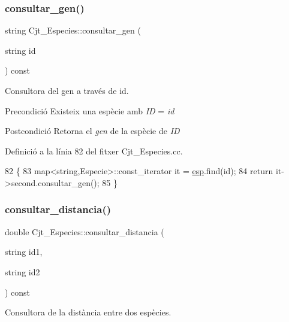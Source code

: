 \subsubsection{\texorpdfstring{consultar\+\_\+gen()}{consultar\_gen()}}
{\footnotesize\ttfamily string Cjt\+\_\+\+Especies\+::consultar\+\_\+gen (\begin{DoxyParamCaption}\item[{string}]{id }\end{DoxyParamCaption}) const}



Consultora del gen a través de id. 

\begin{DoxyPrecond}{Precondició}
Existeix una espècie amb {\itshape ID} = {\itshape id} 
\end{DoxyPrecond}
\begin{DoxyPostcond}{Postcondició}
Retorna el {\itshape gen} de la espècie de {\itshape ID} 
\end{DoxyPostcond}


Definició a la línia 82 del fitxer Cjt\+\_\+\+Especies.\+cc.


\begin{DoxyCode}
82                                                   \{
83     map<string,Especie>::const\_iterator it = \hyperlink{class_cjt___especies_aa232ab8543b78ea6d8ecaa1e5f9ccef5}{esp}.find(\textcolor{keywordtype}{id});
84     \textcolor{keywordflow}{return} it->second.consultar\_gen();
85 \}
\end{DoxyCode}
\mbox{\label{class_cjt___especies_a1d8c033fe5697951d2b24c4f732b28e5}} 
\subsubsection{\texorpdfstring{consultar\+\_\+distancia()}{consultar\_distancia()}}
{\footnotesize\ttfamily double Cjt\+\_\+\+Especies\+::consultar\+\_\+distancia (\begin{DoxyParamCaption}\item[{string}]{id1,  }\item[{string}]{id2 }\end{DoxyParamCaption}) const}



Consultora de la distància entre dos espècies. 


